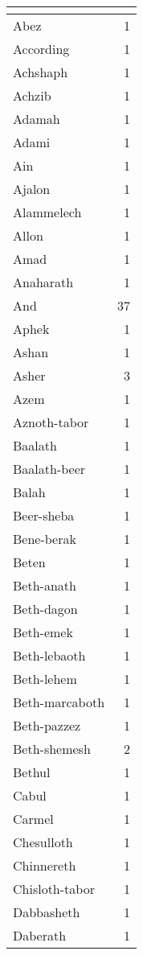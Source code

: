 \begin{center}
\begin{longtable}{l|r}
\hline \multicolumn{2}{c}{{ }} \\ \hline
\endfoot 
Abez & 1\\ \hline 
According & 1\\ \hline 
Achshaph & 1\\ \hline 
Achzib & 1\\ \hline 
Adamah & 1\\ \hline 
Adami & 1\\ \hline 
Ain & 1\\ \hline 
Ajalon & 1\\ \hline 
Alammelech & 1\\ \hline 
Allon & 1\\ \hline 
Amad & 1\\ \hline 
Anaharath & 1\\ \hline 
And & 37\\ \hline 
Aphek & 1\\ \hline 
Ashan & 1\\ \hline 
Asher & 3\\ \hline 
Azem & 1\\ \hline 
Aznoth-tabor & 1\\ \hline 
Baalath & 1\\ \hline 
Baalath-beer & 1\\ \hline 
Balah & 1\\ \hline 
Beer-sheba & 1\\ \hline 
Bene-berak & 1\\ \hline 
Beten & 1\\ \hline 
Beth-anath & 1\\ \hline 
Beth-dagon & 1\\ \hline 
Beth-emek & 1\\ \hline 
Beth-lebaoth & 1\\ \hline 
Beth-lehem & 1\\ \hline 
Beth-marcaboth & 1\\ \hline 
Beth-pazzez & 1\\ \hline 
Beth-shemesh & 2\\ \hline 
Bethul & 1\\ \hline 
Cabul & 1\\ \hline 
Carmel & 1\\ \hline 
Chesulloth & 1\\ \hline 
Chinnereth & 1\\ \hline 
Chisloth-tabor & 1\\ \hline 
Dabbasheth & 1\\ \hline 
Daberath & 1\\ \hline 

\end{longtable}
\end{center}
